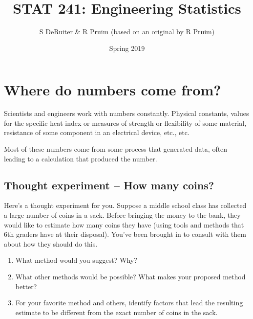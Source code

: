 \documentclass[twoside]{book}\usepackage[]{graphicx}\usepackage[]{xcolor}
\title{STAT 241: Engineering Statistics}
\author{S DeRuiter \& R Pruim (based on an original by R Pruim)}
\date{Spring 2019}
\def\Chapter#1{%
\chapter{#1}
}
\begin{document}

\maketitle

\let\savecleardoublepage\cleardoublepage
\let\cleardoublepage\clearpage 

\setcounter{tocdepth}{1}
\tableofcontents

\let\cleardoublepage\savecleardoublepage






\setcounter{chapter}{-1}
\Chapter{Where do numbers come from?}

Scientists and engineers work with numbers constantly.  Physical constants, values for 
the specific heat index or measures of strength or flexibility of some material, 
resistance of some component in an electrical device, etc., etc.

Most of these numbers come from some process that generated data, often leading to a calculation
that produced the number.  
% 

\section*{Thought experiment -- How many coins?}
Here's a thought experiment for you.  Suppose a middle school class has collected a 
large number of coins in a sack.  Before bringing the money to the bank, they would like
to estimate how many coins they have (using tools and methods that 6th graders have at
their disposal).  You've been brought in to consult with them about how they should do this.
\begin{enumerate}
	\item
What method would you suggest?  Why?
\item
What other methods would be possible?  What makes your proposed method better?
\item
For your favorite method and others, identify factors that lead the resulting estimate
to be different from the exact number of coins in the sack.  
\end{enumerate}
\end{document}
